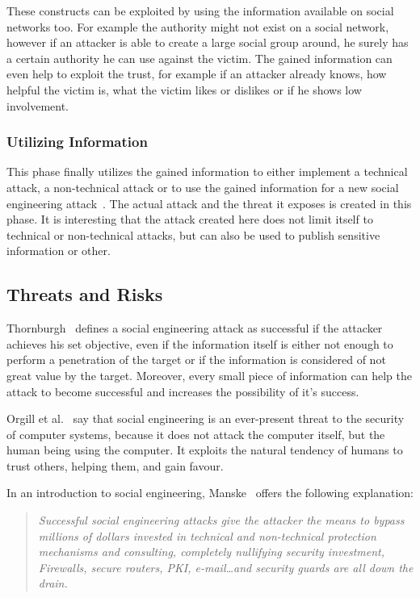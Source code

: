These constructs can be exploited by using the information available on social
networks too. For example the authority might not exist on a social network,
however if an attacker is able to create a large social group around, he surely
has a certain authority he can use against the victim. The gained information
can even help to exploit the trust, for example if an attacker already knows,
how helpful the victim is, what the victim likes or dislikes or if he shows low
involvement.

\subsubsection{Utilizing Information}

This phase finally utilizes the gained information to either implement a
technical attack, a non-technical attack or to use the gained information for a
new social engineering attack~\cite{thornburgh2004}. The actual attack and the
threat it exposes is created in this phase. It is interesting that the attack
created here does not limit itself to technical or non-technical attacks, but
can also be used to publish sensitive information or other.

\subsection{Threats and Risks}

Thornburgh~\cite{thornburgh2004} defines a social engineering attack as
successful if the attacker achieves his set objective, even if the information itself
is either not enough to perform a penetration of the target or if the
information is considered of not great value by the target. Moreover, every
small piece of information can help the attack to become successful and increases the
possibility of it's success.

Orgill et al.~\cite{orgill2004} say that social engineering is an ever-present
threat to the security of computer systems, because it does not attack the
computer itself, but the human being using the computer. It exploits the
natural tendency of humans to trust others, helping them, and gain favour.

In an introduction to social engineering, Manske~\cite{manske2000} offers the
following explanation:

\begin{quote}
\textit{Successful social engineering attacks give the attacker the means to bypass
millions of dollars invested in technical and non-technical protection
mechanisms and consulting, completely nullifying security investment,
Firewalls, secure routers, PKI, e-mail\dots and security guards are all down
the drain.}
\end{quote}

